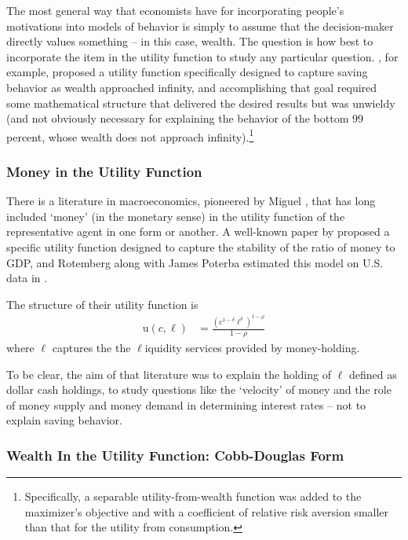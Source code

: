 \documentclass{article}
\newcommand{\CRRA}{\rho}
\newcommand{\uFunc}{\mathrm{u}}
\newcommand{\cNrm}{c}
\newcommand{\lqdt}{\ell}
\begin{document}
The most general way that economists have for incorporating people's motivations into models of behavior is simply to assume that the decision-maker directly values something -- in this case, wealth.
The question is how best to incorporate the item in the utility function to study any particular question.
\cite{WhyDoTheRich}, for example, proposed a utility function specifically designed to capture saving behavior as wealth approached infinity, and accomplishing that goal required some mathematical structure that delivered the desired results but was unwieldy (and not obviously necessary for explaining the behavior of the bottom 99 percent, whose wealth does not approach infinity).\footnote{Specifically, a separable utility-from-wealth function was added to the maximizer's objective and with a coefficient of relative risk aversion smaller than that for the utility from consumption.}

\subsubsection{Money in the Utility Function}

There is a literature in macroeconomics, pioneered by Miguel \cite{sidrauski1967rational}, that has long included `money' (in the monetary sense) in the utility function of the representative agent in one form or another.
A well-known paper by \cite{Rotemberg1984} proposed a specific utility function designed to capture the stability of the ratio of money to GDP, and Rotemberg along with James Poterba estimated this model on U.S. data in \cite{Poterba_1986}.

The structure of their utility function is
\begin{align}
    \uFunc(\cNrm,\lqdt) & = \frac{\left(
        \cNrm^{1-\delta}\lqdt^{\delta}
        \right)^{1-\CRRA}}{1-\CRRA}
\end{align}
where $\lqdt$ captures the the $\lqdt$iquidity services provided by money-holding.

To be clear, the aim of that literature was to explain the holding of $\lqdt$ defined as dollar cash holdings, to study questions like the `velocity' of money and the role of money supply and money demand in determining interest rates -- not to explain saving behavior.

\subsubsection{Wealth In the Utility Function: Cobb-Douglas Form}
\end{document}
